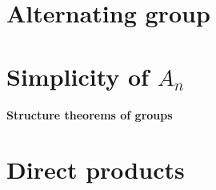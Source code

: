 \documentclass[twocolumn]{article}
\begin{document}
\section{Alternating group}
\setcounter{defi}{0}
\setcounter{teo}{0}
\setcounter{coro}{0}


\section{Simplicity of $A_n$}
\setcounter{defi}{0}
\setcounter{teo}{0}
\setcounter{coro}{0}


\textbf{\huge Structure theorems of groups}
\section{Direct products}
\end{document}
